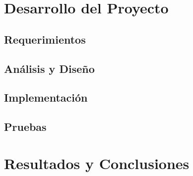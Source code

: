 \documentclass[12pt,letterpaper,spanish]{report}
\begin{document}





\chapter{Desarrollo del Proyecto}
\newpage

\section{Requerimientos}

\section{Análisis y Diseño}

\section{Implementación}

\section{Pruebas}



\chapter{Resultados y Conclusiones}
\newpage
\end{document}
